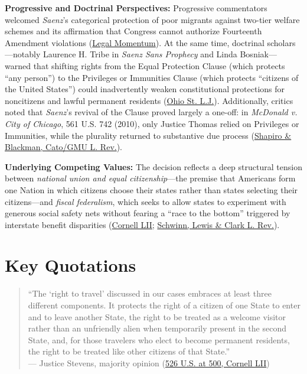 \documentclass[12pt]{article}
\begin{document}
\textbf{Progressive and Doctrinal Perspectives:} Progressive commentators welcomed \textit{Saenz}'s categorical protection of poor migrants against two-tier welfare schemes and its affirmation that Congress cannot authorize Fourteenth Amendment violations (\href{https://www.legalmomentum.org/library/saenz-v-roe}{Legal Momentum}). At the same time, doctrinal scholars---notably Laurence H. Tribe in \textit{Saenz Sans Prophecy} and Linda Bosniak---warned that shifting rights from the Equal Protection Clause (which protects ``any person'') to the Privileges or Immunities Clause (which protects ``citizens of the United States'') could inadvertently weaken constitutional protections for noncitizens and lawful permanent residents (\href{https://kb.osu.edu/bitstream/handle/1811/70511/OSLJ_V63N5_1285.pdf}{Ohio St. L.J.}). Additionally, critics noted that \textit{Saenz}'s revival of the Clause proved largely a one-off: in \textit{McDonald v. City of Chicago}, 561 U.S. 742 (2010), only Justice Thomas relied on Privileges or Immunities, while the plurality returned to substantive due process (\href{https://www.cato.org/sites/cato.org/files/2020-04/shapiro-blackman-gmlr-priv-imm-clause.pdf}{Shapiro \& Blackman, Cato/GMU L. Rev.}).

\textbf{Underlying Competing Values:} The decision reflects a deep structural tension between \emph{national union and equal citizenship}---the premise that Americans form one Nation in which citizens choose their states rather than states selecting their citizens---and \emph{fiscal federalism}, which seeks to allow states to experiment with generous social safety nets without fearing a ``race to the bottom'' triggered by interstate benefit disparities (\href{https://www.law.cornell.edu/supremecourt/text/98-97}{Cornell LII}; \href{https://law.lclark.edu/live/files/9702-schwinnpdf}{Schwinn, Lewis \& Clark L. Rev.}).

\section{Key Quotations}

\begin{quote}
``The `right to travel' discussed in our cases embraces at least three different components. It protects the right of a citizen of one State to enter and to leave another State, the right to be treated as a welcome visitor rather than an unfriendly alien when temporarily present in the second State, and, for those travelers who elect to become permanent residents, the right to be treated like other citizens of that State.'' \\
--- Justice Stevens, majority opinion (\href{https://www.law.cornell.edu/supremecourt/text/98-97}{526 U.S. at 500, Cornell LII})
\end{quote}
\end{document}
